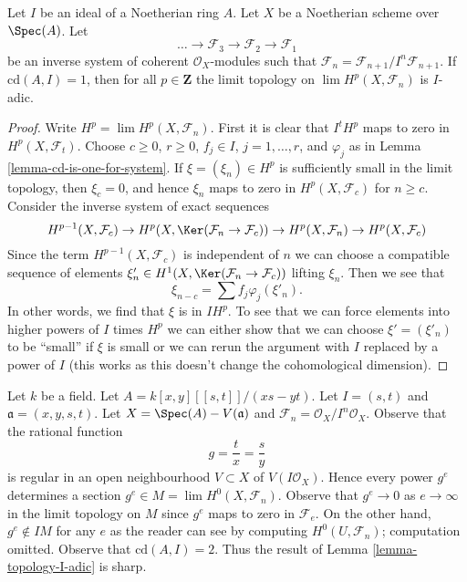 \begin{lemma}
\label{lemma-topology-I-adic}
Let $I$ be an ideal of a Noetherian ring $A$. Let $X$ be a Noetherian scheme
over $\Spec(A)$. Let
$$
\ldots \to \mathcal{F}_3 \to \mathcal{F}_2 \to \mathcal{F}_1
$$
be an inverse system of coherent $\mathcal{O}_X$-modules
such that $\mathcal{F}_n = \mathcal{F}_{n + 1}/I^n\mathcal{F}_{n + 1}$.
If $\text{cd}(A, I) = 1$, then for all $p \in \mathbf{Z}$ the limit topology on
$\lim H^p(X, \mathcal{F}_n)$ is $I$-adic.
\end{lemma}

\begin{proof}
Write $H^p = \lim H^p(X, \mathcal{F}_n)$. First it is clear that
$I^t H^p$ maps to zero in $H^p(X, \mathcal{F}_t)$. Choose
$c \geq 0$, $r \geq 0$, $f_j \in I$, $j = 1, \ldots, r$, and
$\varphi_j$ as in Lemma \ref{lemma-cd-is-one-for-system}.
If $\xi = (\xi_n) \in H^p$ is sufficiently small in the limit topology, then
$\xi_c = 0$, and hence $\xi_n$ maps to zero in $H^p(X, \mathcal{F}_c)$
for $n \geq c$. Consider the inverse system of exact sequences
$$
H^{p - 1}(X, \mathcal{F}_c) \to
H^p(X, \Ker(\mathcal{F}_n \to \mathcal{F}_c)) \to
H^p(X, \mathcal{F}_n) \to
H^p(X, \mathcal{F}_c)
$$
Since the term $H^{p - 1}(X, \mathcal{F}_c)$ is independent of
$n$ we can choose a compatible sequence of elements
$\xi'_n \in H^1(X, \Ker(\mathcal{F}_n \to \mathcal{F}_c))$
lifting $\xi_n$. Then we see that
$$
\xi_{n - c} = \sum f_j\varphi_j(\xi'_n).
$$
In other words, we find that $\xi$ is in $I H^p$. To see that we can
force elements into higher powers of $I$ times $H^p$ we can either show that
we can choose $\xi' = (\xi'_n)$ to be ``small'' if $\xi$ is small
or we can rerun the argument with $I$ replaced by a power of $I$
(this works as this doesn't change the cohomological dimension).
\end{proof}

\begin{example}
\label{example-not-I-adic}
Let $k$ be a field. Let $A = k[x, y][[s, t]]/(xs - yt)$.
Let $I = (s, t)$ and $\mathfrak a = (x, y, s, t)$.
Let $X = \Spec(A) - V(\mathfrak a)$ and
$\mathcal{F}_n = \mathcal{O}_X/I^n\mathcal{O}_X$.
Observe that the rational function
$$
g = \frac{t}{x} = \frac{s}{y}
$$
is regular in an open neighbourhood $V \subset X$ of
$V(I\mathcal{O}_X)$. Hence every power $g^e$ determines a section
$g^e \in M = \lim H^0(X, \mathcal{F}_n)$. Observe that
$g^e \to 0$ as $e \to \infty$ in the limit topology on $M$
since $g^e$ maps to zero in $\mathcal{F}_e$.
On the other hand, $g^e \not \in IM$ for any $e$
as the reader can see by computing $H^0(U, \mathcal{F}_n)$;
computation omitted. Observe that $\text{cd}(A, I) = 2$.
Thus the result of Lemma \ref{lemma-topology-I-adic} is sharp.
\end{example}







